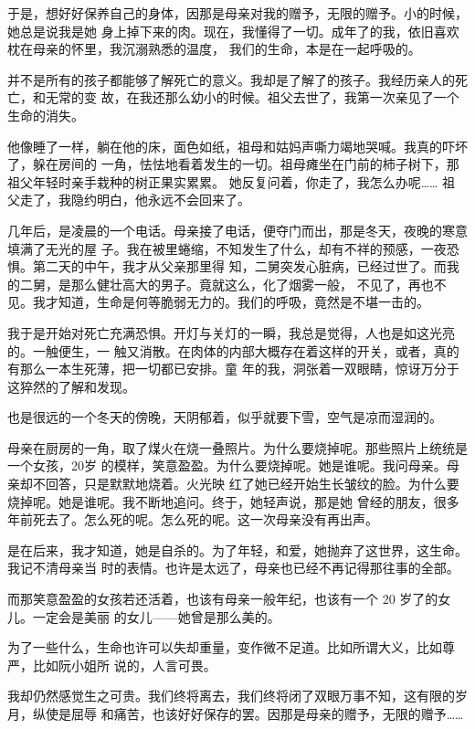 		于是，想好好保养自己的身体，因那是母亲对我的赠予，无限的赠予。小的时候，她总是说我是她
	身上掉下来的肉。现在，我懂得了一切。成年了的我，依旧喜欢枕在母亲的怀里，我沉溺熟悉的温度，
	我们的生命，本是在一起呼吸的。

		并不是所有的孩子都能够了解死亡的意义。我却是了解了的孩子。我经历亲人的死亡，和无常的变
	故，在我还那么幼小的时候。祖父去世了，我第一次亲见了一个生命的消失。

		他像睡了一样，躺在他的床，面色如纸，祖母和姑妈声嘶力竭地哭喊。我真的吓坏了，躲在房间的
	一角，怯怯地看着发生的一切。祖母瘫坐在门前的柿子树下，那祖父年轻时亲手栽种的树正果实累累。
	她反复问着，你走了，我怎么办呢…… 祖父走了，我隐约明白，他永远不会回来了。

		几年后，是凌晨的一个电话。母亲接了电话，便夺门而出，那是冬天，夜晚的寒意填满了无光的屋
	子。我在被里蜷缩，不知发生了什么，却有不祥的预感，一夜恐惧。第二天的中午，我才从父亲那里得
	知，二舅突发心脏病，已经过世了。而我的二舅，是那么健壮高大的男子。竟就这么，化了烟雾一般，
	不见了，再也不见。我才知道，生命是何等脆弱无力的。我们的呼吸，竟然是不堪一击的。

		我于是开始对死亡充满恐惧。开灯与关灯的一瞬，我总是觉得，人也是如这光亮的。一触便生，一
	触又消散。在肉体的内部大概存在着这样的开关，或者，真的有那么一本生死薄，把一切都已安排。童
	年的我，洞张着一双眼睛，惊讶万分于这猝然的了解和发现。

		也是很远的一个冬天的傍晚，天阴郁着，似乎就要下雪，空气是凉而湿润的。

		母亲在厨房的一角，取了煤火在烧一叠照片。为什么要烧掉呢。那些照片上统统是一个女孩，20岁
	的模样，笑意盈盈。为什么要烧掉呢。她是谁呢。我问母亲。母亲却不回答，只是默默地烧着。火光映
	红了她已经开始生长皱纹的脸。为什么要烧掉呢。她是谁呢。我不断地追问。终于，她轻声说，那是她
	曾经的朋友，很多年前死去了。怎么死的呢。怎么死的呢。这一次母亲没有再出声。

		是在后来，我才知道，她是自杀的。为了年轻，和爱，她抛弃了这世界，这生命。我记不清母亲当
	时的表情。也许是太远了，母亲也已经不再记得那往事的全部。

		而那笑意盈盈的女孩若还活着，也该有母亲一般年纪，也该有一个 20 岁了的女儿。一定会是美丽
	的女儿——她曾是那么美的。

		为了一些什么，生命也许可以失却重量，变作微不足道。比如所谓大义，比如尊严，比如阮小姐所
	说的，人言可畏。

		我却仍然感觉生之可贵。我们终将离去，我们终将闭了双眼万事不知，这有限的岁月，纵使是屈辱
	和痛苦，也该好好保存的罢。因那是母亲的赠予，无限的赠予……


